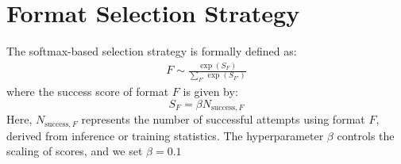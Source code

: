 









\newpage

\section{Format Selection Strategy}\label{app:methods}

The softmax-based selection strategy is formally defined as:
\begin{align}\label{eq:softmax_format_selection}
    F \sim \frac{\exp(S_{F})}{\sum_{F'} \exp(S_{F'})}
\end{align}
where the success score of format $F$ is given by:
$$S_{F}=\beta N_{\text{success},F}$$
Here, $N_{\text{success},F}$ represents the number of successful attempts using format $F$, derived from inference or training statistics. The hyperparameter $\beta$ controls the scaling of scores, and we set $\beta=0.1$

